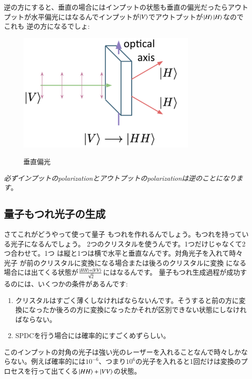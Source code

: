 逆の方にすると、垂直の場合にはインプットの状態も垂直の偏光だったらアウトプットが水平偏光にはなるんでインプットが$\ket{V}$でアウトプットが$\ket{H}\ket{H}$なのでこれも
逆の方になるでしょ:
\begin{figure}[H]
   \centering
    \includegraphics[width=0.8\textwidth]{lesson4/vertical_optical_axis.pdf}
    \label{fig: 1}
    \begin{center}
        \caption{垂直偏光}
    \end{center}
\end{figure}

\textit{必ずインプットのpolarizationとアウトプットのpolarizationは逆のことになります}。

\subsection{量子もつれ光子の生成}
さてこれがどうやって使って量子
もつれを作れるんでしょう。もつれを持っている光子になるんでしょう。
2つのクリスタルを使うんです。1つだけじゃなくて2つ合わせて。1つ
は縦と1つは横で水平と垂直なんです。対角光子を入れて時々光子
が前のクリスタルに変換になる場合または後ろのクリスタルに変換
になる場合には出てくる状態が$\frac{\ket{HH}+\ket{VV}}{\sqrt{2}}$にはなるんです。
量子もつれ生成過程が成功するのには、いくつかの条件があるんです:
\begin{enumerate}
    \item クリスタルはすごく薄くしなければならないんです。そうすると前の方に変換になったか後ろの方に変換になったかそれが区別できない状態にしなければならない。
    \item SPDCを行う場合には確率的にすごくめずらしい。
\end{enumerate}このインプットの対角の光子は強い光のレーザーを入れることなんで時々しかならない。例えば確率的には$10^{-6}$、つまり$10^{6}$の光子を入れると1回だけは変換のプロセスを行って出てくる$\ket{HH}+\ket{VV}$の状態。

